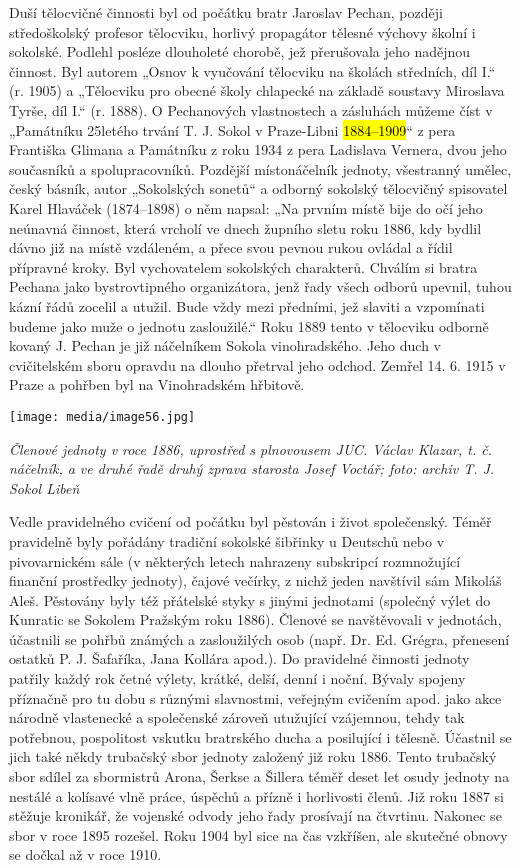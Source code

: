 Duší tělocvičné činnosti byl od počátku bratr Jaroslav Pechan, později
středoškolský profesor tělocviku, horlivý propagátor tělesné výchovy
školní i sokolské. Podlehl posléze dlouholeté chorobě, jež přerušovala
jeho nadějnou činnost. Byl autorem „Osnov k vyučování tělocviku na
školách středních, díl I.`` (r. 1905) a „Tělocviku pro obecné školy
chlapecké na základě soustavy Miroslava Tyrše, díl I.`` (r. 1888). O
Pechanových vlastnostech a zásluhách můžeme číst v „Památníku 25letého
trvání T. J. Sokol v Praze-Libni \hl{1884--⁠⁠⁠⁠⁠⁠1909}`` z pera Františka
Glimana a Památníku z roku 1934 z pera Ladislava Vernera, dvou jeho
současníků a spolupracovníků. Pozdější místonáčelník jednoty, všestranný
umělec, český básník, autor „Sokolských sonetů`` a odborný sokolský
tělocvičný spisovatel Karel Hlaváček (1874--1898) o něm napsal: „Na
prvním místě bije do očí jeho neúnavná činnost, která vrcholí ve dnech
župního sletu roku 1886, kdy bydlil dávno již na místě vzdáleném, a
přece svou pevnou rukou ovládal a řídil přípravné kroky. Byl
vychovatelem sokolských charakterů. Chválím si bratra Pechana jako
bystrovtipného organizátora, jenž řady všech odborů upevnil, tuhou kázní
řádů zocelil a utužil. Bude vždy mezi předními, jež slaviti a vzpomínati
budeme jako muže o jednotu zasloužilé.`` Roku 1889 tento v tělocviku
odborně kovaný J. Pechan je již náčelníkem Sokola vinohradského. Jeho
duch v cvičitelském sboru opravdu na dlouho přetrval jeho odchod. Zemřel
14. 6. 1915 v Praze a pohřben byl na Vinohradském hřbitově.

\texttt{[image: media/image56.jpg]}

\emph{Členové jednoty v roce 1886, uprostřed s plnovousem JUC. Václav
Klazar, t. č. náčelník, a ve druhé řadě druhý zprava starosta Josef
Voctář; foto: archiv T. J. Sokol Libeň}

Vedle pravidelného cvičení od počátku byl pěstován i život společenský.
Téměř pravidelně byly pořádány tradiční sokolské šibřinky u Deutschů
nebo v pivovarnickém sále (v některých letech nahrazeny subskripcí
rozmnožující finanční prostředky jednoty), čajové večírky, z nichž jeden
navštívil sám Mikoláš Aleš. Pěstovány byly též přátelské styky s jinými
jednotami (společný výlet do Kunratic se Sokolem Pražským roku 1886).
Členové se navštěvovali v jednotách, účastnili se pohřbů známých a
zasloužilých osob (např. Dr. Ed. Grégra, přenesení ostatků P. J.
Šafaříka, Jana Kollára apod.). Do pravidelné činnosti jednoty patřily
každý rok četné výlety, krátké, delší, denní i noční. Bývaly spojeny
příznačně pro tu dobu s různými slavnostmi, veřejným cvičením apod. jako
akce národně vlastenecké a společenské zároveň utužující vzájemnou,
tehdy tak potřebnou, pospolitost vskutku bratrského ducha a posilující i
tělesně. Účastnil se jich také někdy trubačský sbor jednoty založený již
roku 1886. Tento trubačský sbor sdílel za sbormistrů Arona, Šerkse a
Šillera téměř deset let osudy jednoty na nestálé a kolísavé vlně práce,
úspěchů a přízně i horlivosti členů. Již roku 1887 si stěžuje kronikář,
že vojenské odvody jeho řady prosívají na čtvrtinu. Nakonec se sbor v
roce 1895 rozešel. Roku 1904 byl sice na čas vzkříšen, ale skutečné
obnovy se dočkal až v roce 1910.

